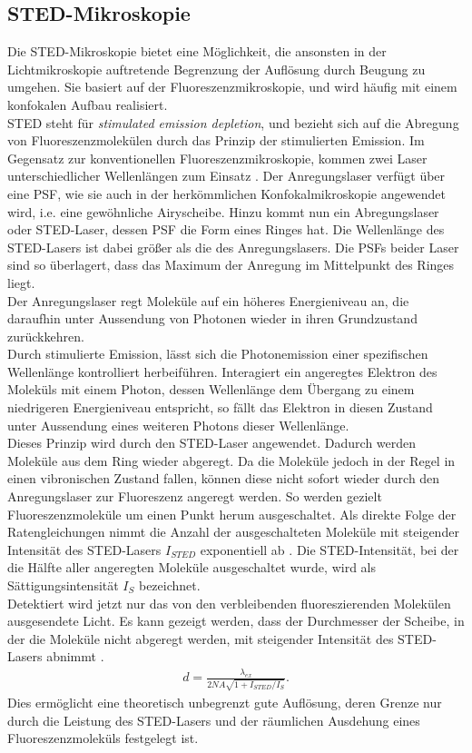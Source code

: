 \subsection{STED-Mikroskopie}
Die STED-Mikroskopie bietet eine Möglichkeit, die ansonsten in der Lichtmikroskopie auftretende Begrenzung der Auflösung durch Beugung zu umgehen.
Sie basiert auf der Fluoreszenzmikroskopie, und wird häufig mit einem konfokalen Aufbau realisiert.
\\
STED steht für \emph{stimulated emission depletion}, und bezieht sich auf die Abregung von Fluoreszenzmolekülen durch das Prinzip der stimulierten Emission. 
Im Gegensatz zur konventionellen Fluoreszenzmikroskopie, kommen zwei Laser unterschiedlicher Wellenlängen zum Einsatz \cite{hell}. 
Der Anregungslaser verfügt über eine PSF, wie sie auch in der herkömmlichen Konfokalmikroskopie angewendet wird, i.e. eine gewöhnliche Airyscheibe.
Hinzu kommt nun ein Abregungslaser oder STED-Laser, dessen PSF die Form eines Ringes hat. 
Die Wellenlänge des STED-Lasers ist dabei größer als die des Anregungslasers.
Die PSFs beider Laser sind so überlagert, dass das Maximum der Anregung im Mittelpunkt des Ringes liegt.
\\
Der Anregungslaser regt Moleküle auf ein höheres Energieniveau an, die daraufhin unter Aussendung von Photonen wieder in ihren Grundzustand zurückkehren.
\\
Durch stimulierte Emission, lässt sich die Photonemission einer spezifischen Wellenlänge kontrolliert herbeiführen.
Interagiert ein angeregtes Elektron des Moleküls mit einem Photon, dessen Wellenlänge dem Übergang zu einem niedrigeren Energieniveau entspricht, so fällt das Elektron in diesen Zustand unter Aussendung eines weiteren Photons dieser Wellenlänge.
\\
Dieses Prinzip wird durch den STED-Laser angewendet. 
Dadurch werden Moleküle aus dem Ring wieder abgeregt.
Da die Moleküle jedoch in der Regel in einen vibronischen Zustand fallen, können diese nicht sofort wieder durch den Anregungslaser zur Fluoreszenz angeregt werden.
So werden gezielt Fluoreszenzmoleküle um einen Punkt herum ausgeschaltet.
Als direkte Folge der Ratengleichungen nimmt die Anzahl der ausgeschalteten Moleküle mit steigender Intensität des STED-Lasers $I_{STED}$ exponentiell ab \cite{hell_exp}.
Die STED-Intensität, bei der die Hälfte aller angeregten Moleküle ausgeschaltet wurde, wird als Sättigungsintensität $I_S$ bezeichnet.
\\
Detektiert wird jetzt nur das von den verbleibenden fluoreszierenden Molekülen ausgesendete Licht. 
Es kann gezeigt werden, dass der Durchmesser der Scheibe, in der die Moleküle nicht abgeregt werden, mit steigender Intensität des STED-Lasers abnimmt \cite{hell}.
\begin{align}
	d = \frac{\lambda_{ex}}{2NA\sqrt{1+I_{STED}/I_S}}. \label{eq:sted_res}
\end{align}
Dies ermöglicht eine theoretisch unbegrenzt gute Auflösung, deren Grenze nur durch die Leistung des STED-Lasers und der räumlichen Ausdehung eines Fluoreszenzmoleküls festgelegt ist.

